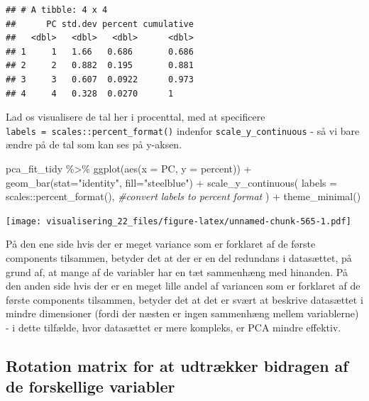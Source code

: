 \documentclass[
]{book}
\newenvironment{Shaded}{\begin{snugshade}}{\end{snugshade}}
\newcommand{\AttributeTok}[1]{\textcolor[rgb]{0.77,0.63,0.00}{#1}}
\newcommand{\CommentTok}[1]{\textcolor[rgb]{0.56,0.35,0.01}{\textit{#1}}}
\newcommand{\FunctionTok}[1]{\textcolor[rgb]{0.00,0.00,0.00}{#1}}
\newcommand{\NormalTok}[1]{#1}
\newcommand{\SpecialCharTok}[1]{\textcolor[rgb]{0.00,0.00,0.00}{#1}}
\newcommand{\StringTok}[1]{\textcolor[rgb]{0.31,0.60,0.02}{#1}}
\begin{document}
\begin{verbatim}
## # A tibble: 4 x 4
##      PC std.dev percent cumulative
##   <dbl>   <dbl>   <dbl>      <dbl>
## 1     1   1.66   0.686       0.686
## 2     2   0.882  0.195       0.881
## 3     3   0.607  0.0922      0.973
## 4     4   0.328  0.0270      1
\end{verbatim}

Lad os visualisere de tal her i procenttal, med at specificere \texttt{labels\ =\ scales::percent\_format()} indenfor \texttt{scale\_y\_continuous} - så vi bare ændre på de tal som kan ses på y-aksen.

\begin{Shaded}
\begin{Highlighting}[]
\NormalTok{pca\_fit\_tidy }\SpecialCharTok{\%\textgreater{}\%}
  \FunctionTok{ggplot}\NormalTok{(}\FunctionTok{aes}\NormalTok{(}\AttributeTok{x =}\NormalTok{ PC, }\AttributeTok{y =}\NormalTok{ percent)) }\SpecialCharTok{+}
  \FunctionTok{geom\_bar}\NormalTok{(}\AttributeTok{stat=}\StringTok{"identity"}\NormalTok{, }\AttributeTok{fill=}\StringTok{"steelblue"}\NormalTok{) }\SpecialCharTok{+}
  \FunctionTok{scale\_y\_continuous}\NormalTok{(}
    \AttributeTok{labels =}\NormalTok{ scales}\SpecialCharTok{::}\FunctionTok{percent\_format}\NormalTok{(), }\CommentTok{\#convert labels to percent format}
\NormalTok{  ) }\SpecialCharTok{+}
  \FunctionTok{theme\_minimal}\NormalTok{()}
\end{Highlighting}
\end{Shaded}

\texttt{[image: visualisering\_22\_files/figure-latex/unnamed-chunk-565-1.pdf]}

På den ene side hvis der er meget variance som er forklaret af de første components tilsammen, betyder det at der er en del redundans i datasættet, på grund af, at mange af de variabler har en tæt sammenhæng med hinanden. På den anden side hvis der er en meget lille andel af variancen som er forklaret af de første components tilsammen, betyder det at det er svært at beskrive datasættet i mindre dimensioner (fordi der næsten er ingen sammenhæng mellem variablerne) - i dette tilfælde, hvor datasættet er mere kompleks, er PCA mindre effektiv.

\hypertarget{rotation-matrix-for-at-udtruxe6kker-bidragen-af-de-forskellige-variabler}{%
\subsection{Rotation matrix for at udtrækker bidragen af de forskellige variabler}\label{rotation-matrix-for-at-udtruxe6kker-bidragen-af-de-forskellige-variabler}}
\end{document}
